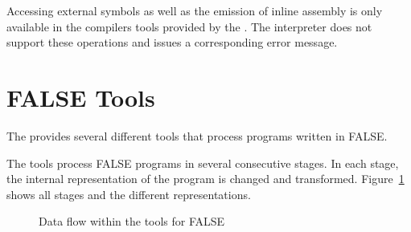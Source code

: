 Accessing external symbols as well as the emission of inline assembly is only available in the compilers tools provided by the \ecs{}.
The interpreter does not support these operations and issues a corresponding error message.

\section{FALSE Tools}

The \ecs{} provides several different tools that process programs written in FALSE\@.
\interface

The tools process FALSE programs in several consecutive stages.
In each stage, the internal representation of the program is changed and transformed.
Figure~\ref{fig:faldataflow} shows all stages and the different representations.

\begin{figure}
\caption{Data flow within the tools for FALSE}
\label{fig:faldataflow}
\end{figure}


